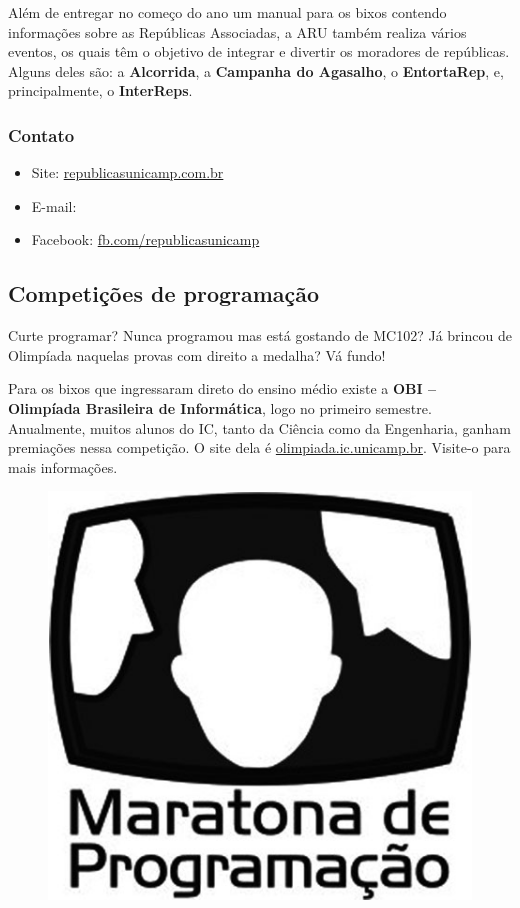 Além de entregar no começo do ano um manual para os bixos contendo informações
sobre as Repúblicas Associadas, a ARU também realiza vários eventos, os quais
têm o objetivo de integrar e divertir os moradores de repúblicas. Alguns deles
são: a \textbf{Alcorrida}, a \textbf{Campanha do Agasalho},
o \textbf{EntortaRep}, e, principalmente, o \textbf{InterReps}.

\subsubsection{Contato}

\begin{itemize}
    \item Site: \url{republicasunicamp.com.br}
    \item E-mail: 
    \item Facebook: \url{fb.com/republicasunicamp}
\end{itemize}

\subsection{Competições de programação}

Curte programar? Nunca programou mas está gostando de MC102? Já brincou de
Olimpíada naquelas provas com direito a medalha? Vá fundo!

Para os bixos que ingressaram direto do ensino médio existe a
\textbf{OBI -- Olimpíada Brasileira de Informática}, logo no primeiro semestre.
Anualmente, muitos alunos do IC, tanto da Ciência como da Engenharia, ganham
premiações nessa competição. O site dela é \url{olimpiada.ic.unicamp.br}.
Visite-o para mais informações.

\begin{figure}[h!]
    \centering
    \includegraphics[scale=0.40, keepaspectratio=true]{img/maratona.png}
\end{figure}

